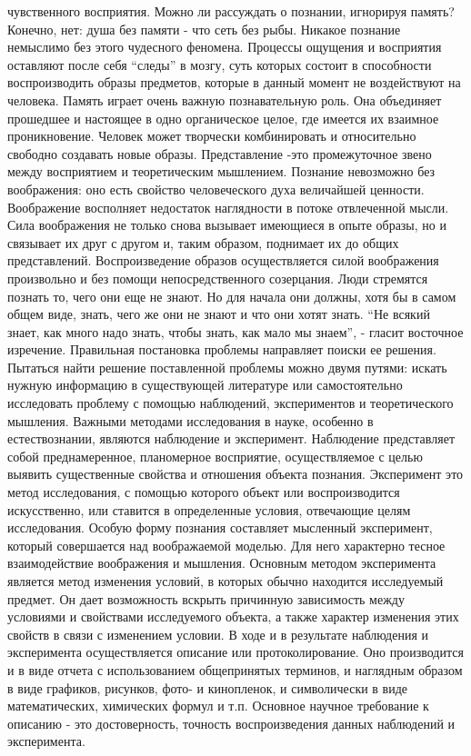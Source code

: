 \documentclass[12pt]{article}
\begin{document}
чувственного восприятия.
Можно ли рассуждать о познании, игнорируя память? Конечно, нет: душа без памяти - что сеть без рыбы.
Никакое познание немыслимо без этого чудесного феномена. Процессы ощущения и восприятия оставляют
после себя “следы” в мозгу, суть которых состоит в способности воспроизводить образы предметов, которые в
данный  момент  не  воздействуют  на  человека.  Память  играет  очень  важную  познавательную  роль.  Она
объединяет прошедшее и настоящее в одно органическое целое, где имеется их взаимное проникновение.
Человек может творчески комбинировать и относительно свободно создавать новые образы. Представление -это  промежуточное  звено  между  восприятием  и  теоретическим  мышлением.  Познание  невозможно  без
воображения:  оно  есть  свойство  человеческого  духа  величайшей  ценности.  Воображение  восполняет
недостаток наглядности в потоке отвлеченной мысли. Сила воображения не только снова вызывает имеющиеся
в опыте образы, но и связывает их друг с другом и, таким образом, поднимает их до общих представлений.
Воспроизведение образов осуществляется силой воображения произвольно и без помощи непосредственного
созерцания.
Люди стремятся познать то, чего они еще не знают. Но для начала они должны, хотя бы в самом общем виде,
знать, чего же они не знают и что они хотят знать. “Не всякий знает, как много надо знать, чтобы знать, как мало
мы знаем”, - гласит восточное изречение.
Правильная  постановка  проблемы  направляет  поиски  ее  решения.  Пытаться  найти  решение  поставленной
проблемы можно двумя путями: искать нужную информацию в существующей литературе или самостоятельно
исследовать проблему с помощью наблюдений, экспериментов и теоретического мышления.
Важными методами исследования в науке, особенно в естествознании, являются наблюдение и эксперимент.
Наблюдение представляет собой преднамеренное, планомерное восприятие, осуществляемое с целью выявить
существенные свойства  и отношения  объекта  познания.  Эксперимент  это  метод  исследования, с  помощью
которого объект или воспроизводится искусственно, или ставится в определенные условия, отвечающие целям
исследования.  Особую  форму  познания  составляет  мысленный  эксперимент,  который  совершается  над
воображаемой моделью. Для него характерно тесное взаимодействие воображения и мышления. Основным
методом эксперимента является метод изменения условий, в которых обычно находится исследуемый предмет.
Он дает возможность вскрыть причинную зависимость между условиями и свойствами исследуемого объекта, а
также характер изменения этих свойств в связи с изменением условии.
В  ходе  и  в  результате  наблюдения  и  эксперимента  осуществляется  описание  или  протоколирование.  Оно
производится  и  в  виде  отчета  с  использованием  общепринятых  терминов,  и  наглядным  образом  в  виде
графиков, рисунков, фото- и кинопленок, и символически в виде математических, химических формул и т.п.
Основное научное требование к описанию - это достоверность, точность воспроизведения данных наблюдений
и эксперимента. 
\end{document}
